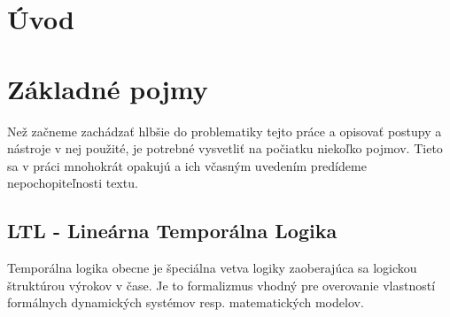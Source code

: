 \documentclass[11pt,final,oneside]{fithesis}
\begin{document}
\FrontMatter
\ThesisTitlePage


\begin{ThesisDeclaration}
\DeclarationText
\AdvisorName
\end{ThesisDeclaration}

\begin{ThesisThanks}
\end{ThesisThanks}

\begin{ThesisAbstract}
\end{ThesisAbstract}

\begin{ThesisKeyWords}
\end{ThesisKeyWords}

\MainMatter
\tableofcontents
\chapter*{\' Uvod}


\chapter{Z\' akladn\' e pojmy}
Ne\v z za\v cneme zach\' adza\v t hlb\v sie do problematiky tejto pr\' ace a opisova\v t postupy a n\' astroje v nej pou\v zit\' e, 
je potrebn\' e vysvetli\v t na po\v ciatku nieko\v lko pojmov. Tieto sa v pr\' aci mnohokr\' at opakuj\' u a ich v\v casn\' ym uveden\' im
pred\' ideme nepochopite\v lnosti textu.

\section{LTL - Line\' arna Tempor\' alna Logika}
Tempor\' alna logika obecne je \v speci\' alna vetva logiky zaoberaj\' uca sa logickou \v strukt\' urou v\' yrokov v \v case. 
Je to formalizmus vhodn\' y pre overovanie vlastnost\' i form\' alnych dynamick\' ych syst\' emov resp. matematick\' ych modelov.
\end{document}

